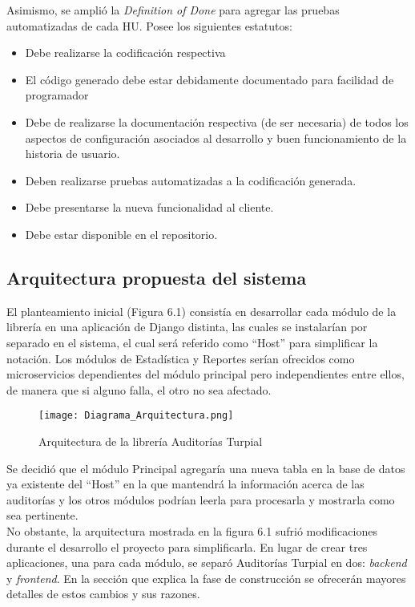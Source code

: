 Asimismo, se amplió la \textit{Definition of Done} para agregar las pruebas automatizadas de cada HU. Posee los siguientes estatutos:

\begin{itemize}
    \item Debe realizarse la codificación respectiva
    \item El código generado debe estar debidamente documentado para facilidad de programador
    \item Debe de realizarse la documentación respectiva (de ser necesaria) de todos los aspectos de configuración asociados al desarrollo y buen funcionamiento de la historia de usuario.
    \item Deben realizarse pruebas automatizadas a la codificación generada.
    \item Debe presentarse la nueva funcionalidad al cliente.
    \item Debe estar disponible en el repositorio.
\end{itemize}

\subsection{Arquitectura propuesta del sistema}

El planteamiento inicial (Figura 6.1) consistía en desarrollar cada módulo de la librería en una aplicación de Django distinta, las cuales se instalarían por separado en el sistema, el cual será referido como “Host” para simplificar la notación. Los módulos de Estadística y Reportes serían ofrecidos como microservicios dependientes del módulo principal pero independientes entre ellos, de manera que si alguno falla, el otro no sea afectado.\\

\begin{figure}
\centering
\texttt{[image: Diagrama\_Arquitectura.png]}
\caption{Arquitectura de la librería Auditorías Turpial}
\label{fig:figure6.1}
\end{figure}

Se decidió que el módulo Principal agregaría una nueva tabla en la base de datos ya existente del “Host” en la que mantendrá la información acerca de las auditorías y los otros módulos podrían leerla para procesarla y mostrarla como sea  pertinente.\\

No obstante, la arquitectura mostrada en la figura 6.1 sufrió modificaciones durante el desarrollo  el proyecto para simplificarla. En lugar de crear tres aplicaciones, una para cada módulo, se separó Auditorías Turpial en dos: \textit{backend} y \textit{frontend}. En la sección que explica la fase de construcción se ofrecerán mayores detalles de estos cambios y sus razones. \\

